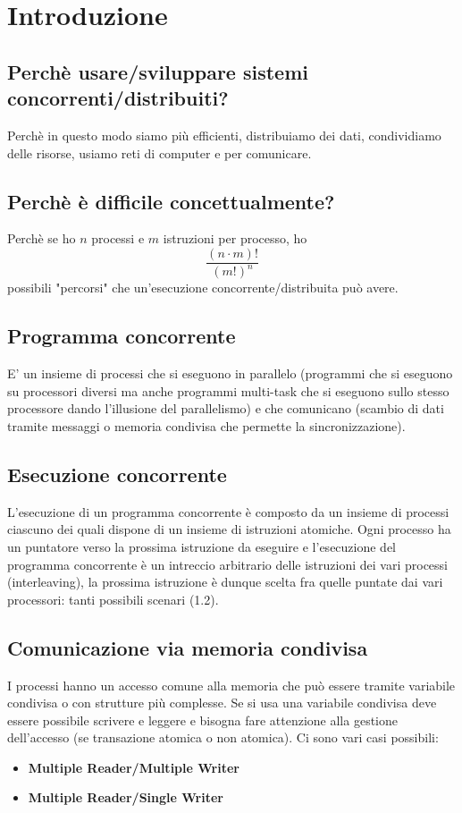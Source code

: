 \documentclass[12pt, a4paper]{report}
\begin{document}
    \newpage
    \tableofcontents
    \chapter{Introduzione}
        \section{Perchè usare/sviluppare sistemi concorrenti/distribuiti?}
            Perchè in questo modo siamo più efficienti, distribuiamo dei dati, condividiamo delle risorse, usiamo reti di computer e per comunicare.
        \section{Perchè è difficile concettualmente?}
            Perchè se ho $n$ processi e $m$ istruzioni per processo, ho
            \begin{equation*}
                \frac{(n\cdot m)!}{(m!)^{n}}
            \end{equation*}
            possibili "percorsi" che un'esecuzione concorrente/distribuita può avere.
        \section{Programma concorrente}
            E' un insieme di processi che si eseguono in parallelo (programmi che si eseguono su processori diversi ma anche programmi multi-task che si eseguono sullo stesso processore dando l'illusione del parallelismo) e che comunicano (scambio di dati tramite messaggi o memoria condivisa che permette la sincronizzazione).
        \section{Esecuzione concorrente}
            L'esecuzione di un programma concorrente è composto da un insieme di processi ciascuno dei quali dispone di un insieme di istruzioni atomiche. Ogni processo ha un puntatore verso la prossima istruzione da eseguire e l'esecuzione del programma concorrente è un intreccio arbitrario delle istruzioni dei vari processi (interleaving), la prossima istruzione è dunque scelta fra quelle puntate dai vari processori: tanti possibili scenari (1.2).
        \section{Comunicazione via memoria condivisa}
            I processi hanno un accesso comune alla memoria che può essere tramite variabile condivisa o con strutture più complesse. Se si usa una variabile condivisa deve essere possibile scrivere e leggere e bisogna fare attenzione alla gestione dell'accesso (se transazione atomica o non atomica). Ci sono vari casi possibili:
            \begin{itemize}
                \item \textbf{Multiple Reader/Multiple Writer}
                \item \textbf{Multiple Reader/Single Writer}
            \end{itemize}
\end{document}
